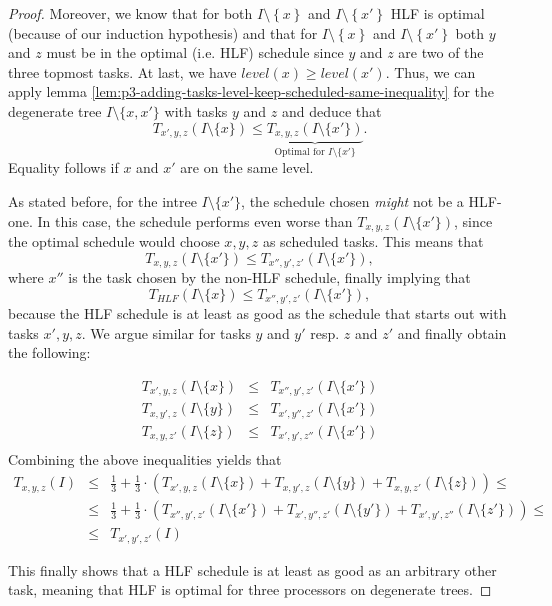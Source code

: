 \begin{proof}
  Moreover, we know that for both $I\setminus\left\{ x \right\}$ and $I\setminus\left\{ x' \right\}$ HLF is optimal (because of our induction hypothesis) and that for $I\setminus\left\{ x \right\}$ and $I\setminus\left\{ x' \right\}$ both $y$ and $z$ must be in the optimal (i.e. HLF) schedule since $y$ and $z$ are two of the three topmost tasks. At last, we have $level(x) \geq level(x')$.
  Thus, we can apply lemma \ref{lem:p3-adding-tasks-level-keep-scheduled-same-inequality} for the degenerate tree $I\setminus \{x,x'\}$ with tasks $y$ and $z$ and deduce that
  \begin{equation*}
    T_{x',y,z}(I\setminus\{x\}) 
    \leq 
    \underbrace{T_{x,y,z}(I\setminus\{x'\})}_{\text{Optimal for $I\setminus \{x'\}$}}.
  \end{equation*}
  Equality follows if $x$ and $x'$ are on the same level.

  As stated before, for the intree $I\setminus\{x'\}$, the schedule chosen \emph{might} not be a HLF-one. In this case, the schedule performs even worse than $T_{x,y,z}(I\setminus\{ x'  \})$, since the optimal schedule would choose $x,y,z$ as scheduled tasks. This means that
  \begin{equation*}
    T_{x,y,z}(I\setminus\{x'\})
    \leq
    T_{x'',y',z'}(I\setminus\{x'\}),
  \end{equation*}
  where $x''$ is the task chosen by the non-HLF schedule, finally implying that
  \begin{equation*}
    T_{HLF}(I\setminus\{x\})
    \leq
    T_{x'',y',z'}(I\setminus\{x'\}),
  \end{equation*}
  because the HLF schedule is at least as good as the schedule that starts out with tasks $x',y,z$.
  We argue similar for tasks $y$ and $y'$ resp. $z$ and $z'$ and finally obtain the following:

  \begin{eqnarray*}
    T_{x',y,z}(I\setminus\{x\})
    & \leq &
    T_{x'',y',z'}(I\setminus\{x'\}) \\
    T_{x,y',z}(I\setminus\{y\})
    & \leq &
    T_{x',y'',z'}(I\setminus\{x'\}) \\
    T_{x,y,z'}(I\setminus\{z\})
    & \leq &
    T_{x',y',z''}(I\setminus\{x'\}) \\
  \end{eqnarray*}
  Combining the above inequalities yields that
  \begin{eqnarray*}
    T_{x,y,z}(I) 
    & \leq & 
    \frac{1}{3} + \frac{1}{3} \cdot 
    \left( 
      T_{x',y,z}(I\setminus\{x\}) +
      T_{x,y',z}(I\setminus\{y\}) +
      T_{x,y,z'}(I\setminus\{z\})
    \right) 
    \leq \\
    & \leq &
    \frac{1}{3} + \frac{1}{3} \cdot 
    \left( 
      T_{x'',y',z'}(I\setminus\{x'\}) +
      T_{x',y'',z'}(I\setminus\{y'\}) +
      T_{x',y',z''}(I\setminus\{z'\})
    \right) \leq \\
    & \leq &
    T_{x',y',z'}(I)
  \end{eqnarray*}

  This finally shows that a HLF schedule is at least as good as an arbitrary other task, meaning that HLF is optimal for three processors on degenerate trees.
\end{proof}
